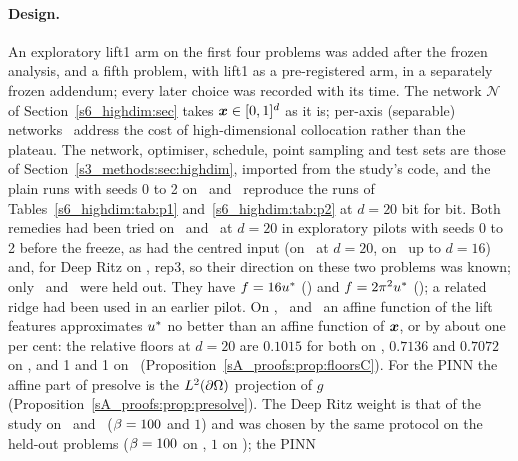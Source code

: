 \paragraph{Design.} An exploratory lift1 arm on the first four problems was added after the
frozen analysis, and a fifth problem, with lift1 as a pre-registered arm, in a separately frozen
addendum; every later choice was recorded with its time. The network $\mathcal N$ of
Section~\ref{s6_highdim:sec} takes $\boldsymbol{x}\in[0,1]^d$ as it is; per-axis (separable)
networks~\citep{cho2023spinn} address the cost of high-dimensional collocation rather than the
plateau.
The network, optimiser, schedule, point sampling and test sets are those of
Section~\ref{s3_methods:sec:highdim}, imported from the study's code, and the plain runs with
seeds 0 to 2 on \Pone\ and \Ptwo\ reproduce the runs of Tables~\ref{s6_highdim:tab:p1}
and~\ref{s6_highdim:tab:p2} at $d=20$ bit for bit.
Both remedies had been tried on \Pone\ and \Ptwo\ at $d=20$ in exploratory pilots with seeds 0 to
2 before the freeze, as had the centred input (on \Pone\ at $d=20$, on \Ptwo\ up to $d=16$) and,
for Deep Ritz on \Pone, rep3, so their direction on these two problems was known; only \Pridge\
and \Pcospair\ were held out. They have $f=16u^{*}$ (\Pridge) and $f=2\pi^2u^{*}$ (\Pcospair); a
related ridge had been used in an earlier pilot. On \Pone, \Pridge\ and \Pcospair\ an affine function of the
lift features approximates $u^{*}$ no better than an affine function of $\boldsymbol{x}$, or by about one per
cent: the relative floors at $d=20$ are $0.1015$ for both on \Pone, $0.7136$ and $0.7072$ on
\Pridge, and 1 and 1 on \Pcospair\ (Proposition~\ref{sA_proofs:prop:floorsC}). For the PINN the
affine part of presolve is the $L^2(\partial\Omega)$ projection of $g$
(Proposition~\ref{sA_proofs:prop:presolve}).
The Deep Ritz weight is that of the study on \Pone\ and \Ptwo\ ($\beta=100$ and $1$) and was chosen
by the same protocol on the held-out problems ($\beta=100$ on \Pridge, $1$ on \Pcospair); the PINN

